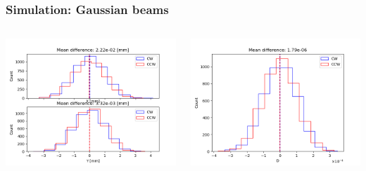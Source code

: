 \documentclass{beamer}
\begin{document}
\begin{frame}
  \frametitle{Simulation: Gaussian beams}
  \vspace*{-.8cm}
  \begin{columns}
    \begin{column}{.5\textwidth}
      \begin{center}
        \includegraphics[height=.5\paperheight]{img/spin_axis_motion/gaussian_beam_histograms_XY}
      \end{center}
    \end{column}
    \begin{column}{.5\textwidth}
      \begin{center}
        \includegraphics[height=.5\paperheight]{img/spin_axis_motion/gaussian_beam_histograms_D}

\end{center}
\end{column}
\end{columns}
\end{frame}
\end{document}
